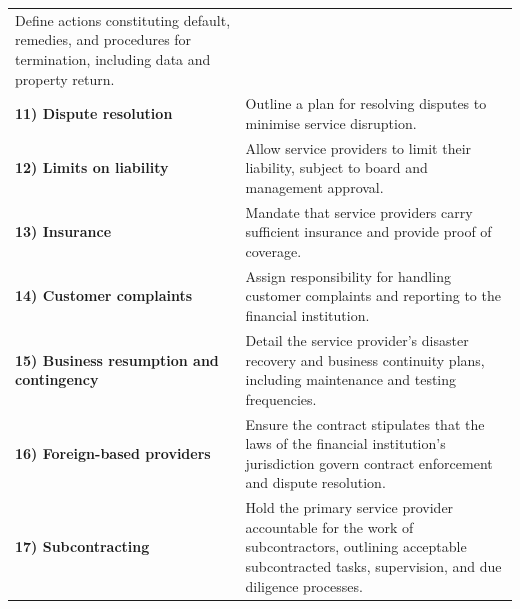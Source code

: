 \begin{minipage}{\textwidth}
\begin{tabularx}{\textwidth}{@{}L{0.27\textwidth}Y@{}}
{\tabfont Define actions constituting default, remedies, and procedures for
termination, including data and property return.}\\
{\tabfont \textbf{11) Dispute resolution}} &
{\tabfont Outline a plan for resolving disputes to minimise service disruption.}\\
{\tabfont \textbf{12) Limits on liability}} &
{\tabfont Allow service providers to limit their liability, subject to board and
management approval.}\\
{\tabfont \textbf{13) Insurance}} &
{\tabfont Mandate that service providers carry sufficient insurance and provide
proof of coverage.}\\
{\tabfont \textbf{14) Customer complaints}} &
{\tabfont Assign responsibility for handling customer complaints and reporting to
the financial institution.}\\
{\tabfont \textbf{15) Business resumption and contingency}} &
{\tabfont Detail the service provider's disaster recovery and business continuity
plans, including maintenance and testing frequencies.}\\
{\tabfont \textbf{16) Foreign-based providers}} &
{\tabfont Ensure the contract stipulates that the laws of the financial
institution's jurisdiction govern contract enforcement and dispute resolution.}\\
{\tabfont \textbf{17) Subcontracting}} &
{\tabfont Hold the primary service provider accountable for the work of
subcontractors, outlining acceptable subcontracted tasks, supervision, and due
diligence processes.}\\
\end{tabularx}
\end{minipage}
